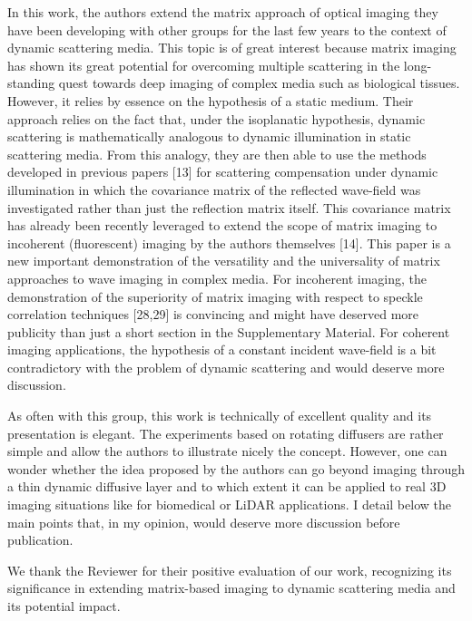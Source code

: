 \documentclass[12pt]{article}
\newenvironment{ourresponse}
    {\begin{tcolorbox}[width=\linewidth,breakable,enhanced,colback=gray!5,colframe=responsecolor!50,title=Response,left=5pt,right=5pt]}
    {\end{tcolorbox}}
\begin{document}
In this work, the authors extend the matrix approach of optical imaging they have been developing with other groups for the last few years to the context of dynamic scattering media. This topic is of great interest because matrix imaging has shown its great potential for overcoming multiple scattering in the long-standing quest towards deep imaging of complex media such as biological tissues. However, it relies by essence on the hypothesis of a static medium. Their approach relies on the fact that, under the isoplanatic hypothesis, dynamic scattering is mathematically analogous to dynamic illumination in static scattering media. From this analogy, they are then able to use the methods developed in previous papers [13] for scattering compensation under dynamic illumination in which the covariance matrix of the reflected wave-field was investigated rather than just the reflection matrix itself. This covariance matrix has already been recently leveraged to extend the scope of matrix imaging to incoherent (fluorescent) imaging by the authors themselves [14]. This paper is a new important demonstration of the versatility and the universality of matrix approaches to wave imaging in complex media. For incoherent imaging, the demonstration of the superiority of matrix imaging with respect to speckle correlation techniques [28,29] is convincing and might have deserved more publicity than just a short section in the Supplementary Material. For coherent imaging applications, the hypothesis of a constant incident wave-field is a bit contradictory with the problem of dynamic scattering and would deserve more discussion.  

As often with this group, this work is technically of excellent quality and its presentation is elegant. The experiments based on rotating diffusers are rather simple and allow the authors to illustrate nicely the concept. However, one can wonder whether the idea proposed by the authors can go beyond imaging through a thin dynamic diffusive layer and to which extent it can be applied to real 3D imaging situations like for biomedical or LiDAR applications. I detail below the main points that, in my opinion, would deserve more discussion before publication.

    \begin{ourresponse}
    We thank the Reviewer for their positive evaluation of our work, recognizing its significance in extending matrix-based imaging to dynamic scattering media and its potential impact.
    \end{ourresponse}
\end{document}
